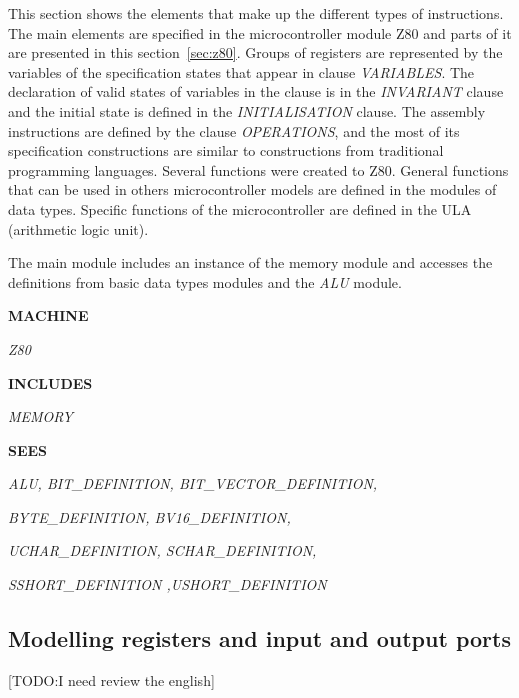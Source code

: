 \documentclass[11pt]{article} %
\begin{document}
This section shows the elements that make up the different types of instructions.
The main elements are specified in the microcontroller module Z80 and parts of it
are presented in this section~\ref{sec:z80}. Groups of registers are represented
by the variables of the specification states that appear in clause
\textit{VARIABLES}. The declaration of valid states of variables in the clause is
in the \textit{INVARIANT} clause and the initial state is defined in the
\textit{INITIALISATION} clause. The assembly instructions are defined by the
clause \textit{OPERATIONS}, and the most of its specification constructions are
similar to constructions from traditional programming languages. Several
functions were created to Z80. General functions that can be used in others
microcontroller models are defined in the modules of data types. Specific
functions of the microcontroller are defined in the ULA (arithmetic logic unit).



The main module includes an instance of the memory module and accesses the definitions from basic data
types modules and the \textit{ALU} module.


\begin{sloppypar}

\bf MACHINE

\hspace*{0.15in}\it Z80

\bf INCLUDES

\hspace*{0.10in}\it MEMORY

\bf SEES

\hspace*{0.10in}\it ALU, \it BIT\_DEFINITION, \it BIT\_VECTOR\_DEFINITION,

\hspace*{0.10in}\it BYTE\_DEFINITION, \it BV16\_DEFINITION,

\hspace*{0.10in}\it UCHAR\_DEFINITION, \it SCHAR\_DEFINITION,

\hspace*{0.10in}\it SSHORT\_DEFINITION ,\it USHORT\_DEFINITION
\end{sloppypar}


\subsection{Modelling registers and input and output ports} [TODO:I need review
the english]
\end{document}
